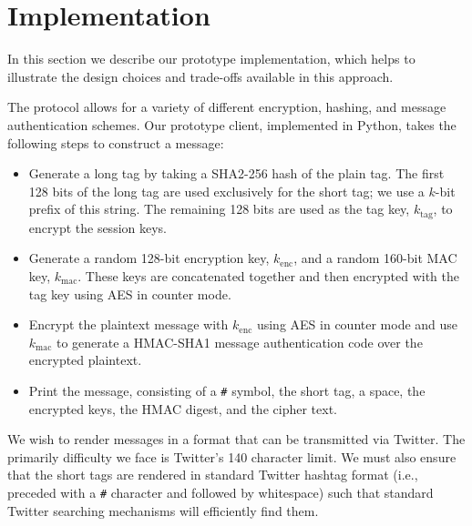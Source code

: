 \section{Implementation}

In this section we describe our prototype \hoot implementation, which
helps to illustrate the design choices and trade-offs available in this
approach.

%
%
The \hoot protocol allows for a variety of different encryption,
hashing, and message authentication schemes. Our prototype client,
implemented in Python, takes the following steps to construct a message:
\begin{itemize}
\item Generate a long tag by taking a SHA2-256 hash of the plain
  tag. The first 128 bits of the long tag are used exclusively for the
  short tag; we use a $k$-bit prefix of this string. The remaining 128
  bits are used as the tag key, $k_{\mathrm{tag}}$, to encrypt the
  session keys.
\item Generate a random 128-bit encryption key, $k_{\mathrm{enc}}$,
   and a random 160-bit MAC key,
  $k_{\mathrm{mac}}$. These keys are
  concatenated together and then encrypted with the tag key using AES in
  counter mode.
\item Encrypt the plaintext message with $k_{\mathrm{enc}}$ using AES in
  counter mode and use $k_{\mathrm{mac}}$ to generate a HMAC-SHA1
  message authentication code over the encrypted plaintext.
\item Print the message, consisting of a {\tt \#} symbol, the short tag,
  a space, the encrypted keys, the HMAC digest, and the cipher text.
\end{itemize}

We wish to render messages in a format that can be transmitted via
Twitter. The primarily difficulty we face is Twitter's 140 character
limit. We must also ensure that the short tags are rendered in standard
Twitter hashtag format (i.e., preceded with a {\tt \#} character and
followed by whitespace) such that standard Twitter searching mechanisms
will efficiently find them.

